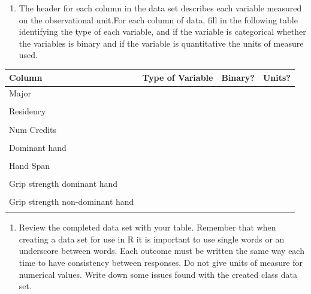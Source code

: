 \documentclass[
]{report}
\providecommand{\tightlist}{%
  \setlength{\itemsep}{0pt}\setlength{\parskip}{0pt}}
\begin{document}
\vspace{0.3in}

\begin{enumerate}
\def\labelenumi{\arabic{enumi}.}
\setcounter{enumi}{2}
\tightlist
\item
  The header for each column in the data set describes each variable measured on the observational unit.For each column of data, fill in the following table identifying the type of each variable, and if the variable is categorical whether the variables is binary and if the variable is quantitative the units of measure used.
\end{enumerate}

\begin{center}
\begin{tabular}{|l|p{1.5in}|p{0.5in}|p{0.5in}|} \hline
Column & Type of Variable & Binary? & Units? \\ \hline
Major & & &\\
& & & \\ \hline
Residency & & & \\
& & & \\ \hline
Num Credits & & & \\
& & & \\ \hline
Dominant hand & & & \\
& & & \\ \hline
Hand Span & & & \\
& & & \\ \hline
Grip strength dominant hand & & & \\
& & & \\ \hline
Grip strength non-dominant hand & & & \\
& & & \\ \hline
\end{tabular}
\end{center}

\begin{enumerate}
\def\labelenumi{\arabic{enumi}.}
\setcounter{enumi}{3}
\tightlist
\item
  Review the completed data set with your table. Remember that when creating a data set for use in R it is important to use single words or an underscore between words. Each outcome must be written the same way each time to have consistency between responses. Do not give units of measure for numerical values. Write down some issues found with the created class data set.
\end{enumerate}

\newpage
\end{document}
